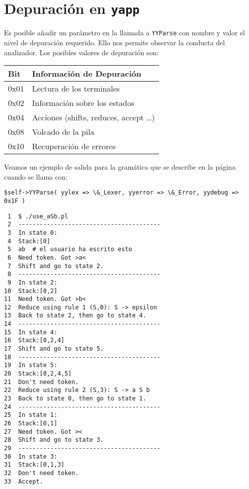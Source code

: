 \section{Depuración en {\tt yapp}}
\label{section:depuracion}
Es posible añadir un parámetro en la llamada a \verb|YYParse|
con nombre  y valor el nivel de depuración requerido.
Ello 
nos permite observar la conducta del analizador. Los 
posibles valores de depuración son:

\vspace{0.5cm}
\begin{center}
\begin{tabular}{|l|l|}
\hline
   Bit      &    Información de Depuración \\
\hline
    0x01    &    Lectura de los terminales\\
\hline
    0x02    &    Información sobre los estados\\
\hline
    0x04    &    Acciones (shifts, reduces, accept \ldots)\\
\hline
    0x08    &    Volcado de la pila\\
\hline
    0x10    &    Recuperación de errores\\
\hline
\end{tabular}
\end{center}
\vspace{0.5cm}
 
 Veamos un ejemplo de salida para la gramática
 que se describe en la página 
 \pageref{apendice:asb}
 cuando se llama con: 

 \verb|$self->YYParse( yylex => \&_Lexer, yyerror => \&_Error, yydebug => 0x1F )|

 \begin{verbatim}
 1  $ ./use_aSb.pl
 2  ----------------------------------------
 3  In state 0:
 4  Stack:[0]
 5  ab  # el usuario ha escrito esto
 6  Need token. Got >a<
 7  Shift and go to state 2.
 8  ----------------------------------------
 9  In state 2:
10  Stack:[0,2]
11  Need token. Got >b<
12  Reduce using rule 1 (S,0): S -> epsilon
13  Back to state 2, then go to state 4.
14  ----------------------------------------
15  In state 4:
16  Stack:[0,2,4]
17  Shift and go to state 5.
18  ----------------------------------------
19  In state 5:
20  Stack:[0,2,4,5]
21  Don't need token.
22  Reduce using rule 2 (S,3): S -> a S b
23  Back to state 0, then go to state 1.
24  ----------------------------------------
25  In state 1:
26  Stack:[0,1]
27  Need token. Got ><
28  Shift and go to state 3.
29  ----------------------------------------
30  In state 3:
31  Stack:[0,1,3]
32  Don't need token.
33  Accept.
 \end{verbatim}

